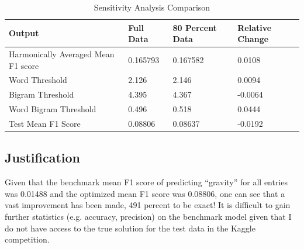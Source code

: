 \documentclass{article}
\begin{document}
\begin{table}[!]
\centering
\caption{Sensitivity Analysis Comparison}
\label{tab:compare_sensitivity}
\begin{tabular}{|l|l|l|l|}
\hline
Output & Full Data & 80 Percent Data & Relative Change  \\ \hline
Harmonically Averaged Mean F1 score & 0.165793 & 0.167582 & 0.0108 \\ \hline
Word Threshold & 2.126 & 2.146 & 0.0094 \\ \hline
Bigram Threshold & 4.395 & 4.367 & -0.0064 \\ \hline
Word Bigram Threshold & 0.496 & 0.518 & 0.0444 \\ \hline
Test Mean F1 Score & 0.08806 & 0.08637 & -0.0192 \\ \hline
\end{tabular}
\end{table}




\subsection{Justification}

Given that the benchmark mean F1 score of predicting ``gravity'' for all
entries was 0.01488 and the optimized mean F1 score was 0.08806, one can see
that a vast improvement has been made, 491 percent to be exact! It is
difficult to gain further statistics (e.g. accuracy, precision) on the
benchmark model given that I do not have access to the true solution for the
test data in the Kaggle competition.
\end{document}
